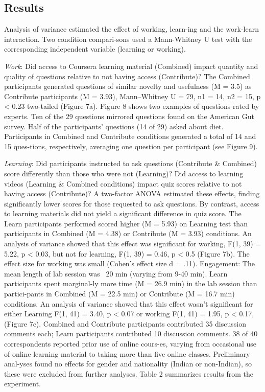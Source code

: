 \subsection{Results}
Analysis of variance estimated the effect of working, learn-ing and the work-learn interaction. Two condition compari-sons used a Mann-Whitney U test with the corresponding independent variable (learning or working). 

\textit{Work}: Did access to Coursera learning material (Combined) impact quantity and quality of questions relative to not having access (Contribute)? The Combined participants generated questions of similar novelty and usefulness (M = 3.5) as Contribute participants (M = 3.93), Mann–Whitney U = 79, n1 = 14, n2 = 15, p < 0.23 two-tailed (Figure 7a). Figure 8 shows two examples of questions rated by experts. Ten of the 29 questions mirrored questions found on the American Gut survey. Half of the participants’ questions (14 of 29) asked about diet. Participants in Combined and Contribute conditions generated a total of 14 and 15 ques-tions, respectively, averaging one question per participant (see Figure 9). 

\textit{Learning}: Did participants instructed to ask questions (Contribute \& Combined) score differently than those who were not (Learning)? Did access to learning videos (Learning \& Combined conditions) impact quiz scores relative to not having access (Contribute)? A two-factor ANOVA estimated these effects, finding significantly lower scores for those requested to ask questions. By contrast, access to learning materials did not yield a significant difference in quiz score.
The Learn participants performed scored higher (M = 5.93) on Learning test than participants in Combined (M = 4.38) or Contribute (M = 3.93) conditions. An analysis of variance showed that this effect was significant for working, F(1, 39) = 5.22, p < 0.03, but not for learning, F(1, 39) = 0.46, p < 0.5 (Figure 7b). The effect size for working was small (Cohen’s effect size d = .11).
Engagement: The mean length of lab session was ~20 min (varying from 9-40 min). Learn participants spent marginal-ly more time (M = 26.9 min) in the lab session than partici-pants in Combined (M = 22.5 min) or Contribute (M = 16.7 min) conditions. An analysis of variance showed that this effect wasn’t significant for either Learning F(1, 41) = 3.40, p < 0.07 or working F(1, 41) = 1.95, p < 0.17, (Figure 7c). Combined and Contribute participants contributed 35 discussion comments each; Learn participants contributed 10 discussion comments.
38 of 40 correspondents reported prior use of online cours-es, varying from occasional use of online learning material to taking more than five online classes. Preliminary anal-yses found no effects for gender and nationality (Indian or non-Indian), so these were excluded from further analyses. Table 2 summarizes results from the experiment. 




